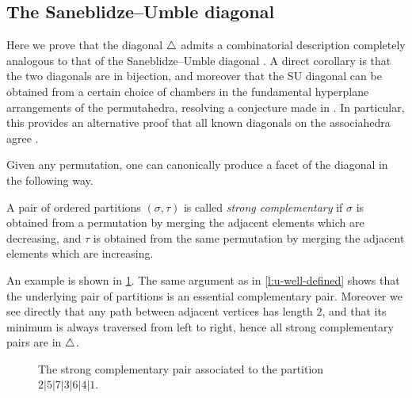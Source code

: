
\subsection{The Saneblidze--Umble diagonal}

Here we prove that the diagonal $\triangle$ admits a combinatorial description completely analogous to that of the Saneblidze--Umble diagonal \cite{SaneblidzeUmble04}. 
A direct corollary is that the two diagonals are in bijection, and moreover that the SU diagonal can be obtained from a certain choice of chambers in the fundamental hyperplane arrangements of the permutahedra, resolving a conjecture made in \cite{LA21}.
In particular, this provides an alternative proof that all known diagonals on the associahedra agree \cite{saneblidzeComparingDiagonalsAssociahedra2022}.

Given any permutation, one can canonically produce a facet of the diagonal in the following way. 

\begin{definition}
    A pair of ordered partitions $(\sigma,\tau)$ is called \emph{strong complementary} if $\sigma$ is obtained from a permutation by merging the adjacent elements which are decreasing, and $\tau$ is obtained from the same permutation by merging the adjacent elements which are increasing.
\end{definition}

An example is shown in \cref{fig:strong-complementary}.
The same argument as in \cref{l:u-well-defined} shows that the underlying pair of partitions is an essential complementary pair. 
Moreover we see directly that any path between adjacent vertices has length $2$, and that its minimum is always traversed from left to right, hence all strong complementary pairs are in $\triangle$. 

\begin{figure}[h!]
\caption{The strong complementary pair associated to the partition $2|5|7|3|6|4|1$.}
\label{fig:strong-complementary}
\end{figure}


